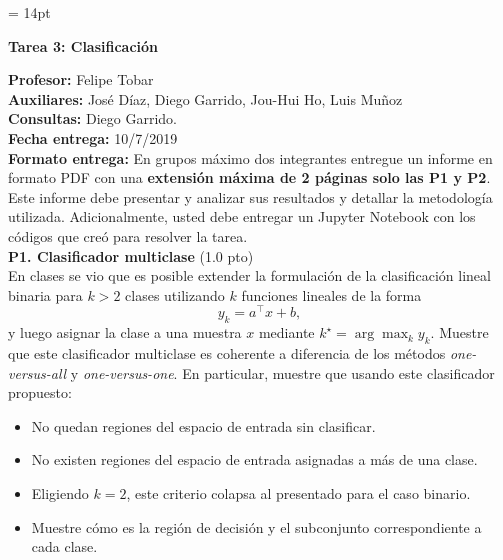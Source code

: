 \documentclass[11pt,letterpaper]{article}
\begin{document}
\pagestyle{fancy}
\fancyhf{}

\headheight = 14pt
\begin{center}
\large {\textbf{Tarea 3: Clasificación}}\\
\end{center}
\textbf{Profesor:} Felipe Tobar\\ 
\textbf{Auxiliares:} José Díaz, Diego Garrido, Jou-Hui Ho, Luis Muñoz \\
\textbf{Consultas:} Diego Garrido.\\
\textbf{Fecha entrega:} 10/7/2019 \\
\textbf{Formato entrega:} En grupos máximo dos integrantes entregue un informe en formato PDF con una \textbf{extensión máxima de 2 páginas solo las P1 y P2}. Este informe debe presentar y analizar sus resultados y detallar la metodología utilizada. Adicionalmente, usted debe entregar un Jupyter Notebook con los códigos que creó para resolver la tarea.\\


\noindent\textbf{P1. Clasificador multiclase} (1.0 pto)\\ 
En clases se vio que es posible extender la formulación de la clasificación lineal binaria para $k>2$ clases utilizando $k$ funciones lineales de la forma
\begin{equation*}
    y_k = a^\top x + b,
\end{equation*}
y luego asignar la clase a una muestra $x$ mediante $k^\star =\arg\max_k y_k$. 
Muestre que este clasificador multiclase es coherente a diferencia de los métodos \emph{one-versus-all} y \emph{one-versus-one}. En particular, muestre que usando este clasificador propuesto:
\begin{itemize}
    \item No quedan regiones del espacio de entrada sin clasificar.
    \item No existen regiones del espacio de entrada asignadas a más de una clase.
    \item Eligiendo $k=2$, este criterio colapsa al presentado para el caso binario.
    \item Muestre cómo es la región de decisión y el subconjunto correspondiente a cada clase.
\end{itemize}
\end{document}
